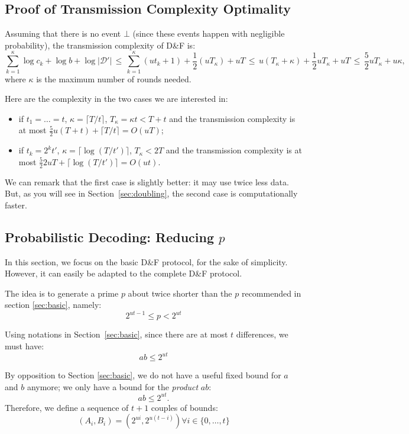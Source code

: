 \documentclass[11pt]{llncs}
\newcommand{\SetD}{\mathcal{D}}
\newcommand{\df}{D\&F\xspace}
\begin{document}
\subsection{Proof of Transmission Complexity Optimality}

Assuming that there is no event $\bot$ (since these events happen with negligible probability), the transmission complexity of \df is:
\[  \sum_{k=1}^\kappa \log c_k + \log b + \log |\SetD'|
 \,\leq\, \sum_{k=1}^\kappa (ut_k+1) + \frac{1}{2} (uT_\kappa) + u T
 \,\leq\, u (T_\kappa + \kappa) + \frac{1}{2} u T_\kappa + u T
 \,\leq\, \frac{5}{2} u T_\kappa + u \kappa, \]
where $\kappa$ is the maximum number of rounds needed.

Here are the complexity in the two cases we are interested in:
\begin{itemize}
\item if $t_1 = \dots = t$, $\kappa = \lceil T/t \rceil$, $T_\kappa = \kappa t < T+t$ and the transmission complexity is at most $\frac{5}{2} u (T+t) + \lceil T/t \rceil = O(uT)$;
\item if $t_k = 2^k t'$, $\kappa = \lceil \log(T/t') \rceil$, $T_\kappa < 2T$ and the transmission complexity is at most $\frac{5}{2} 2uT + \lceil \log(T/t') \rceil = O(ut)$.
\end{itemize}
We can remark that the first case is slightly better: it may use twice less data.
But, as you will see in Section~\ref{sec:doubling}, the second case is computationally faster.

\subsection{Probabilistic Decoding: Reducing $p$}

In this section, we focus on the basic \df protocol, for the sake of simplicity.
However, it can easily be adapted to the complete \df protocol.

The idea is to generate a prime $p$ about twice shorter than the $p$ recommended in section \ref{sec:basic}, namely:
\begin{equation}
\label{eqnewp}
2^{ut-1}\leq p < 2^{ut}
\end{equation}

Using notations in Section~\ref{sec:basic}, since there are at most $t$ differences, we must have:
\begin{equation}
\label{eqab}
a b \leq 2^{ut}
\end{equation}

By opposition to Section \ref{sec:basic}, we do not have a useful fixed bound for $a$ and $b$ anymore; we only have a bound for the \textit{product} $a b$: 
\begin{equation}
\label{eqab}
ab \leq 2^{ut}.
\end{equation} 
Therefore, we define a sequence of $t+1$ couples of bounds:
\[\left(A_i, B_i\right) = \left(2^{ui}, 2^{u(t-i)}\right) \forall i \in \{0,\dots,t\} \]
\end{document}
